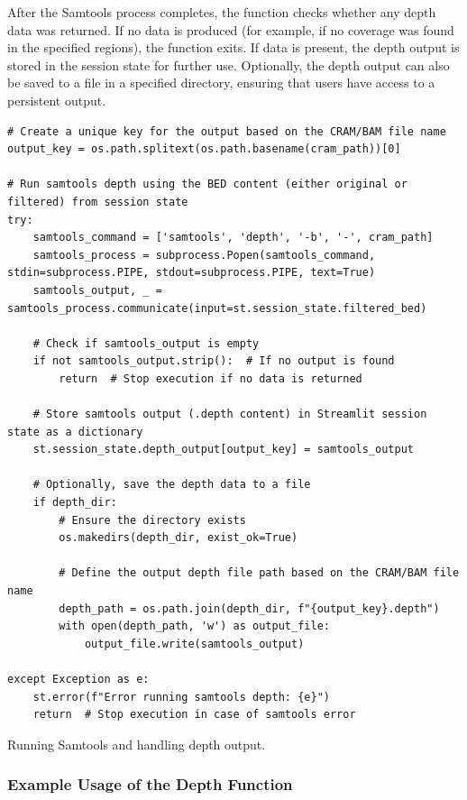 After the Samtools process completes, the function checks whether any depth data was returned. If no data is produced (for example, if no coverage was found in the specified regions), the function exits. If data is present, the depth output is stored in the session state for further use. Optionally, the depth output can also be saved to a file in a specified directory, ensuring that users have access to a persistent output.

\begin{longlisting}
\begin{verbatim}
# Create a unique key for the output based on the CRAM/BAM file name
output_key = os.path.splitext(os.path.basename(cram_path))[0]

# Run samtools depth using the BED content (either original or filtered) from session state
try:
    samtools_command = ['samtools', 'depth', '-b', '-', cram_path]
    samtools_process = subprocess.Popen(samtools_command, stdin=subprocess.PIPE, stdout=subprocess.PIPE, text=True)
    samtools_output, _ = samtools_process.communicate(input=st.session_state.filtered_bed)

    # Check if samtools_output is empty
    if not samtools_output.strip():  # If no output is found
        return  # Stop execution if no data is returned

    # Store samtools output (.depth content) in Streamlit session state as a dictionary
    st.session_state.depth_output[output_key] = samtools_output

    # Optionally, save the depth data to a file
    if depth_dir:
        # Ensure the directory exists
        os.makedirs(depth_dir, exist_ok=True)

        # Define the output depth file path based on the CRAM/BAM file name
        depth_path = os.path.join(depth_dir, f"{output_key}.depth")
        with open(depth_path, 'w') as output_file:
            output_file.write(samtools_output)

except Exception as e:
    st.error(f"Error running samtools depth: {e}")
    return  # Stop execution in case of samtools error
\end{verbatim}
\caption{Running Samtools and handling depth output.}
\label{lbl:samtools4}
\end{longlisting}

\subsubsection{\textbf{Example Usage of the Depth Function}}

